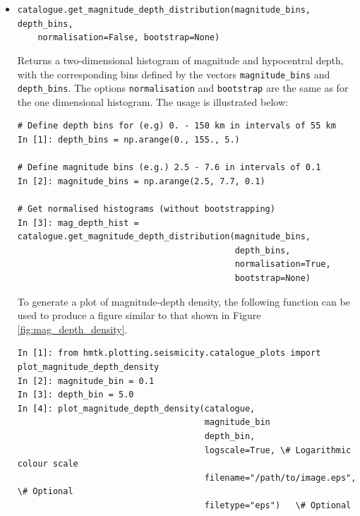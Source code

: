 \begin{itemize}
\item \verb;catalogue.get_magnitude_depth_distribution(magnitude_bins, depth_bins,;\\
\verb;    normalisation=False, bootstrap=None); 

Returns a two-dimensional histogram of magnitude and hypocentral depth, with the corresponding bins defined by the vectors \verb=magnitude_bins= and \verb=depth_bins=. The options \verb=normalisation= and \verb=bootstrap= are the same as for the one dimensional histogram. The usage is illustrated below:

\begin{Verbatim}[frame=single, commandchars=\\\{\}, fontsize=\scriptsize, samepage=true]
# Define depth bins for (e.g) 0. - 150 km in intervals of 55 km
In [1]: depth_bins = np.arange(0., 155., 5.)

# Define magnitude bins (e.g.) 2.5 - 7.6 in intervals of 0.1
In [2]: magnitude_bins = np.arange(2.5, 7.7, 0.1)

# Get normalised histograms (without bootstrapping)
In [3]: mag_depth_hist = catalogue.get_magnitude_depth_distribution(magnitude_bins,
                                           depth_bins,
                                           normalisation=True,
                                           bootstrap=None)
\end{Verbatim}

To generate a plot of magnitude-depth density, the following function can be used to produce a figure similar to that shown in Figure \ref{fig:mag_depth_density}.

\begin{Verbatim}[frame=single, commandchars=\\\{\}, fontsize=\scriptsize, samepage=true]
In [1]: from hmtk.plotting.seismicity.catalogue_plots import plot_magnitude_depth_density
In [2]: magnitude_bin = 0.1
In [3]: depth_bin = 5.0 
In [4]: plot_magnitude_depth_density(catalogue,
                                     magnitude_bin
                                     depth_bin,
                                     logscale=True, \# Logarithmic colour scale
                                     filename="/path/to/image.eps", \# Optional
                                     filetype="eps")   \# Optional
\end{Verbatim}


\end{itemize}
